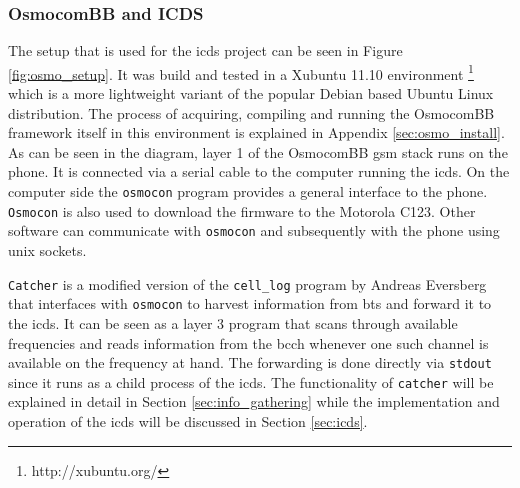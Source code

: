 \subsubsection{OsmocomBB and ICDS}
The setup that is used for the \gls{icds} project can be seen in Figure \ref{fig:osmo_setup}.
It was build and tested in a Xubuntu 11.10 environment \footnote{http://xubuntu.org/} which is a more lightweight variant of the popular Debian based Ubuntu Linux distribution.
The process of acquiring, compiling and running the OsmocomBB framework itself in this environment is explained in Appendix \ref{sec:osmo_install}.
As can be seen in the diagram, layer 1 of the OsmocomBB \gls{gsm} stack runs on the phone.
It is connected via a serial cable to the computer running the \gls{icds}.
On the computer side the \texttt{osmocon} program provides a general interface to the phone.
\texttt{Osmocon} is also used to download the firmware to the Motorola C123.
Other software can communicate with \texttt{osmocon} and subsequently with the phone using unix sockets.

\texttt{Catcher} is a modified version of the \texttt{cell\_log} program by Andreas Eversberg that interfaces with \texttt{osmocon} to harvest information from \gls{bts} and forward it to the \gls{icds}.
It can be seen as a layer 3 program that scans through available frequencies and reads information from the \gls{bcch} whenever one such channel is available on the frequency at hand.
The forwarding is done directly via \texttt{stdout} since it runs as a child process of the \gls{icds}.
The functionality of \texttt{catcher} will be explained in detail in Section \ref{sec:info_gathering} while the implementation and operation of the \gls{icds} will be discussed in Section \ref{sec:icds}.

